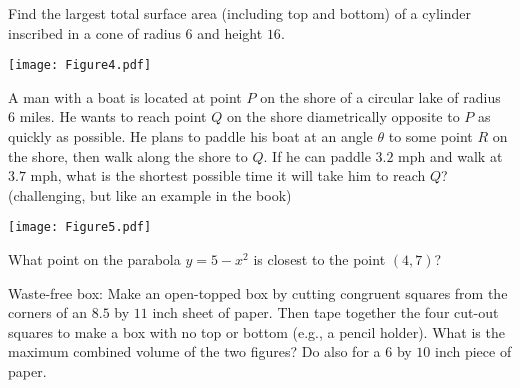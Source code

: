 \documentclass[handout,nooutcomes]{ximera}
\begin{document}
\begin{problem}
Find the largest total surface area (including top and bottom) of a cylinder inscribed in a cone of radius $6$ and height $16$. 

		\begin{image}
		\texttt{[image: Figure4.pdf]}
		\end{image}
\end{problem}



\begin{problem}
A man with a boat is located at point $P$ on the shore of a circular lake of radius $6$ miles.  He wants to reach point $Q$ on the shore diametrically opposite to $P$ as quickly as possible.  He plans to paddle his boat at an angle $\theta$ to some point $R$ on the shore, then walk along the shore to $Q$.  If he can paddle $3.2$ mph and walk at $3.7$ mph, what is the shortest possible time it will take him to reach $Q$? (challenging, but like an example in the book)

		\begin{image}
		\texttt{[image: Figure5.pdf]}
		\end{image}
\end{problem}



\begin{problem}
What point on the parabola $y=5-x^2$ is closest to the point $(4,7)$?  
\end{problem}



\begin{problem}
Waste-free box: Make an open-topped box by cutting congruent squares from the corners of an $8.5$ by $11$ inch sheet of paper.  Then tape together the four cut-out squares to make a box with no top or bottom (e.g., a pencil holder).  What is the maximum combined volume of the two figures?  Do also for a $6$ by $10$ inch piece of paper.
\end{problem}
\end{document}
